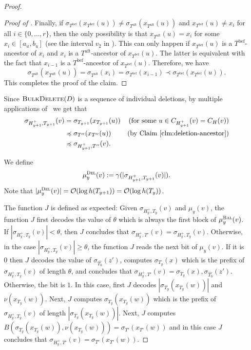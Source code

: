 \documentclass[kpfonts]{patmorin}
\newcommand{\Oh}{\mathcal{O}}
\let\geq\geqslant
\let\preceq\preccurlyeq
\begin{document}
\begin{proof}
\begin{proof}[Proof of ]
    Finally, if $\sigma_{T^{\text{bef}}}(x_{T^{\text{bef}}}(u))\neq \sigma_{T^{\text{aft}}}(x_{T^{\text{aft}}}(u))$ and
    $x_{T^{\text{bef}}}(u)\neq x_i$ for all $i\in\{0,\dots,r\}$, 
    then the only possibility is that $x_{T^{\text{aft}}}(u)=x_i$ for some $x_i\in [a_u,b_u]$ (see the interval $v_2$ in ). 
    This can only happen if $x_{T^{\text{bef}}}(u)$ is a $T^{\text{bef}}$-ancestor of $x_i$ and $x_i$ is a $T^{\text{aft}}$-ancestor of $x_{T^{\text{bef}}}(u)$. 
    The latter is equivalent with the fact that $x_{i-1}$ is a $T^{\text{bef}}$-ancestor of $x_{T^{\text{bef}}}(u)$.
    Therefore, we have
    \[
    \sigma_{T^{\text{aft}}}(x_{T^{\text{aft}}}(u)) = \sigma_{T^{\text{aft}}}(x_i) = 
    \sigma_{T^{\text{bef}}}(x_{i-1}) \prec \sigma_{T^{\text{bef}}}(x_{T^{\text{bef}}}(u)).
    \]
    This completes the proof of the claim.
  \end{proof}

Since $\textsc{BulkDelete}(D)$ is a sequence of individual deletions, by multiple applications of~ we get that 
  \begin{align*}
    \sigma_{H^+_{y+1},T_{y+1}}(v)
      & = \sigma_{T_{y+1}}(x_{T_{y+1}}(u)) & \text{(for some $u\in C_{H^+_{y+1}}(v)=C_H(v)$)} \\
      & \preceq \sigma_{T''}(x_{T''}(u)) & \text{(by \clmref{deletion-ancestor})} \\
      & \preceq \sigma_{H^+_{y+1},T''}(v). %
  \end{align*}

We define 
  \[\mu_y^{\textsc{Del}}(v) := \gamma(|\sigma_{H^{+}_{y+1},T_{y+1}}(v)|).
  \]
Note that $|\mu_y^{\textsc{Del}}(v)| = \Oh(\log h(T_{y+1})) = \Oh(\log h(T_y))$.

  The function $J$ is defined as expected:
  Given $\sigma_{H^+_y,T_{y}}(v)$ and $\mu_y(v)$, 
  the function $J$ first decodes the value of $\theta$ 
  which is always the first block of $\mu_y^{\textsc{Bal}}(v)$.
  If $|\sigma_{H^+_y,T_{y}}(v)| < \theta$, then 
  $J$ concludes that $\sigma_{H^+_y,T'}(v) = \sigma_{H^+_y,T_{y}}(v)$.
  Otherwise, in the case $|\sigma_{H^+_y,T_{y}}(v)| \geq \theta$,
  the function $J$ reads the next bit of $\mu_y(v)$. 
  If it is $0$ then $J$ decodes the value of $\sigma_{\hat{T_0}}(z')$, 
  computes $\sigma_{T_y}(x)$ which is the prefix of $\sigma_{H^+_y,T_{y}}(v)$ of length $\theta$, 
  and concludes that $\sigma_{H^+_y,T'}(v) = \sigma_{T_y}(x),\sigma_{\hat{T_0}}(z')$.
  Otherwise, the bit is $1$. 
  In this case, first $J$ decodes $|\sigma_{T_y}(x_{T_y}(w))|$ and $\nu(x_{T_y}(w))$. 
  Next, $J$ computes $\sigma_{T_y}(x_{T_y}(w))$ which is the prefix of $\sigma_{H^+_y,T_{y}}(v)$ of length $|\sigma_{T_y}(x_{T_y}(w))|$. 
  Next, $J$ computes $B(\sigma_{T_y}(x_{T_y}(w)),\nu(x_{T_y}(w))) = \sigma_{T'}(x_{T'}(w))$ and in this case 
  $J$ concludes that $\sigma_{H^+_y,T'}(v) = \sigma_{T'}(x_{T'}(w))$.



\end{proof}
\end{document}
